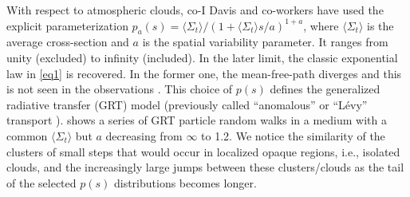 \documentclass[12pt]{article}
\begin{document}
With respect to atmospheric clouds, co-I Davis and co-workers have used the explicit parameterization $p_a(s) = \langle\Sigma_t\rangle/\left(1+\langle\Sigma_t\rangle s/a\right)^{1+a}$, where $\langle\Sigma_t\rangle$ is the average cross-section and $a$ is the spatial variability parameter.
It ranges from unity (excluded) to infinity (included).
In the later limit, the classic exponential law in \cref{eq1} is recovered.
In the former one, the mean-free-path diverges and this is not seen in the observations \cite{schetal06}.
This choice of $p(s)$ defines the generalized radiative transfer (GRT) model \cite{davxu14,xudav16} (previously called ``anomalous'' or ``L\'evy'' transport \cite{davmar97}).
 shows a series of GRT particle random walks in a medium with a common $\langle\Sigma_t\rangle$ but $a$ decreasing from $\infty$ to 1.2.
We notice the similarity of the clusters of small steps that would occur in localized opaque regions, i.e., isolated clouds, and the increasingly large jumps between these clusters/clouds as the tail of the selected $p(s)$ distributions becomes longer.
\end{document}
